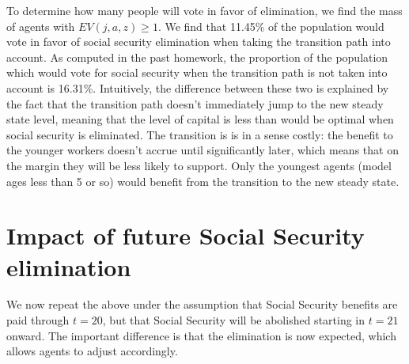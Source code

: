 \documentclass[12pt]{article}
\begin{document}
To determine how many people will vote in favor of elimination, we find the mass of agents with $EV(j, a, z) \geq 1$. We find that 11.45\% of the population would vote in favor of social security elimination when taking the transition path into account. As computed in the past homework, the proportion of the population which would vote for social security when the transition path is not taken into account is 16.31\%. Intuitively, the difference between these two is explained by the fact that the transition path doesn't immediately jump to the new steady state level, meaning that the level of capital is less than would be optimal when social security is eliminated. The transition is is in a sense costly: the benefit to the younger workers doesn't accrue until significantly later, which means that on the margin they will be less likely to support. Only the youngest agents (model ages less than 5 or so) would benefit from the transition to the new steady state. 
\section{Impact of future Social Security elimination}
We now repeat the above under the assumption that Social Security benefits are paid through $t= 20$, but that Social Security will be abolished starting in $t = 21$ onward. The important difference is that the elimination is now expected, which allows agents to adjust accordingly. 
\end{document}
